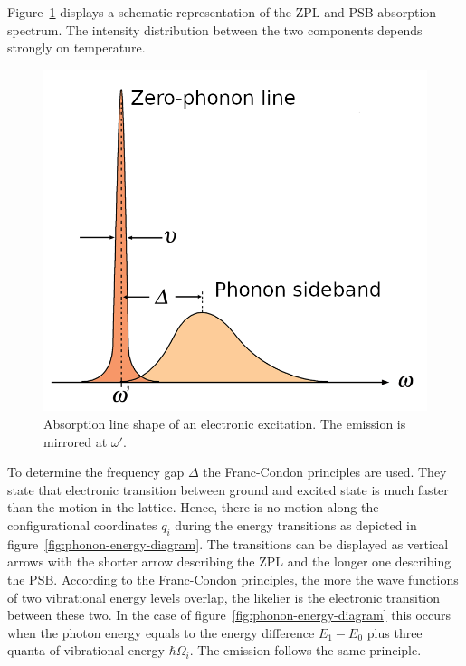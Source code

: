 Figure~\ref{fig:line-shape} displays a schematic representation of the \ac{ZPL} and \ac{PSB} absorption spectrum.
The intensity distribution between the two components depends strongly on temperature.
\begin{figure}[H]
	\centering
	\includegraphics[width=0.6\linewidth]{figures/quantum-dot/Line-shape}
	\caption[Absorption line shape of an electronic excitation.]{Absorption line shape of an electronic excitation.
		The emission is mirrored at $\omega'$.}
	\label{fig:line-shape}
\end{figure}
To determine the frequency gap $\Delta$ the Franc-Condon principles are used.
They state that electronic transition between ground and excited state is much faster than the motion in the lattice.
Hence, there is no motion along the configurational coordinates $q_i$ during the energy transitions as depicted in figure~\ref{fig:phonon-energy-diagram}.
The transitions can be displayed as vertical arrows with the shorter arrow describing the \ac{ZPL} and the longer one describing the \ac{PSB}.
According to the Franc-Condon principles, the more the wave functions of two vibrational energy levels overlap, the likelier is the electronic transition between these two.
In the case of figure~\ref{fig:phonon-energy-diagram} this occurs when the photon energy equals to the energy difference $E_1-E_0$ plus three quanta of vibrational energy $\hbar \Omega_i$.
The emission follows the same principle.
